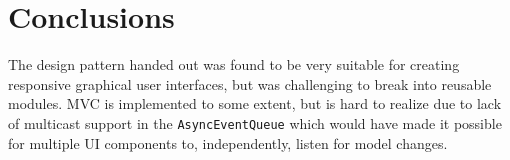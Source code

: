 \documentclass[10pt]{scrartcl}
\begin{document}
\section{Conclusions}
The design pattern handed out was found to be very suitable for creating responsive graphical user interfaces, but was challenging to break into reusable modules. MVC is implemented to some extent, but is hard to realize due to lack of multicast support in the \texttt{AsyncEventQueue} which would have made it possible for multiple UI components to, independently, listen for model changes. 


\end{document}
